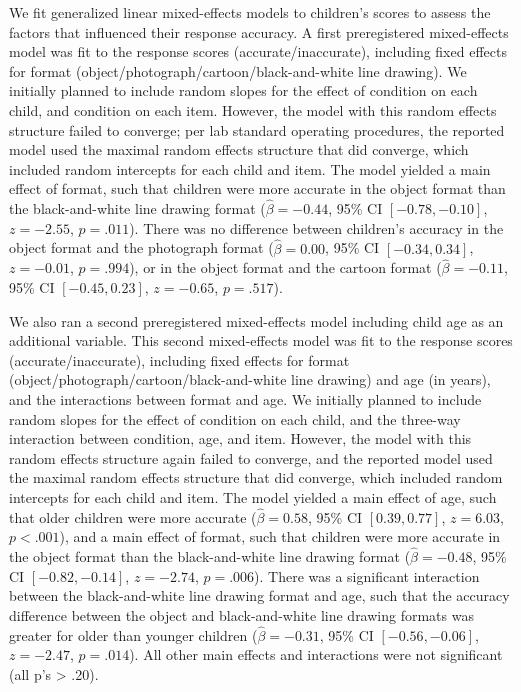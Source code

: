 \documentclass[10pt, letterpaper]{article}
\begin{document}
We fit generalized linear mixed-effects models to children's scores to
assess the factors that influenced their response accuracy. A first
preregistered mixed-effects model was fit to the response scores
(accurate/inaccurate), including fixed effects for format
(object/photograph/cartoon/black-and-white line drawing). We initially
planned to include random slopes for the effect of condition on each
child, and condition on each item. However, the model with this random
effects structure failed to converge; per lab standard operating
procedures, the reported model used the maximal random effects structure
that did converge, which included random intercepts for each child and
item. The model yielded a main effect of format, such that children were
more accurate in the object format than the black-and-white line drawing
format (\(\hat{\beta} = -0.44\), 95\% CI \([-0.78, -0.10]\),
\(z = -2.55\), \(p = .011\)). There was no difference between children's
accuracy in the object format and the photograph format
(\(\hat{\beta} = 0.00\), 95\% CI \([-0.34, 0.34]\), \(z = -0.01\),
\(p = .994\)), or in the object format and the cartoon format
(\(\hat{\beta} = -0.11\), 95\% CI \([-0.45, 0.23]\), \(z = -0.65\),
\(p = .517\)).

We also ran a second preregistered mixed-effects model including child
age as an additional variable. This second mixed-effects model was fit
to the response scores (accurate/inaccurate), including fixed effects
for format (object/photograph/cartoon/black-and-white line drawing) and
age (in years), and the interactions between format and age. We
initially planned to include random slopes for the effect of condition
on each child, and the three-way interaction between condition, age, and
item. However, the model with this random effects structure again failed
to converge, and the reported model used the maximal random effects
structure that did converge, which included random intercepts for each
child and item. The model yielded a main effect of age, such that older
children were more accurate (\(\hat{\beta} = 0.58\), 95\% CI
\([0.39, 0.77]\), \(z = 6.03\), \(p < .001\)), and a main effect of
format, such that children were more accurate in the object format than
the black-and-white line drawing format (\(\hat{\beta} = -0.48\), 95\%
CI \([-0.82, -0.14]\), \(z = -2.74\), \(p = .006\)). There was a
significant interaction between the black-and-white line drawing format
and age, such that the accuracy difference between the object and
black-and-white line drawing formats was greater for older than younger
children (\(\hat{\beta} = -0.31\), 95\% CI \([-0.56, -0.06]\),
\(z = -2.47\), \(p = .014\)). All other main effects and interactions
were not significant (all p's \textgreater{} .20).
\end{document}
